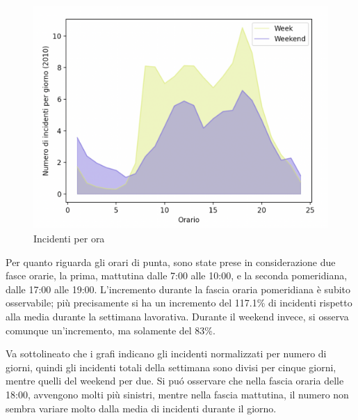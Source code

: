 \documentclass[a4paper]{report}
\begin{document}
\begin{figure}
    \includegraphics[width=\linewidth]{../src/incidenti/incidenti_senza_coords/ore_punta/week_weekend.png}
    \caption{Incidenti per ora}
    \label{fig:week_weekend}
\end{figure}

Per quanto riguarda gli orari di punta, sono state prese in considerazione due fasce orarie, la prima, 
mattutina dalle 7:00 alle 10:00, e la seconda pomeridiana, dalle 17:00 alle 19:00.
L'incremento durante la fascia oraria pomeridiana è subito osservabile; più precisamente si 
ha un incremento del 117.1\% di incidenti rispetto alla media durante la settimana lavorativa. 
Durante il weekend invece, si osserva comunque un'incremento, ma solamente del 83\%.


%


Va sottolineato che i grafi indicano gli incidenti normalizzati per numero di 
giorni, 
quindi gli incidenti totali della settimana sono divisi per cinque giorni, 
mentre quelli del weekend per due.
Si pu\'o osservare che nella fascia oraria delle 18:00, 
avvengono molti più sinistri, mentre nella fascia mattutina, 
il numero non sembra variare molto dalla media di incidenti durante il giorno.
\end{document}
